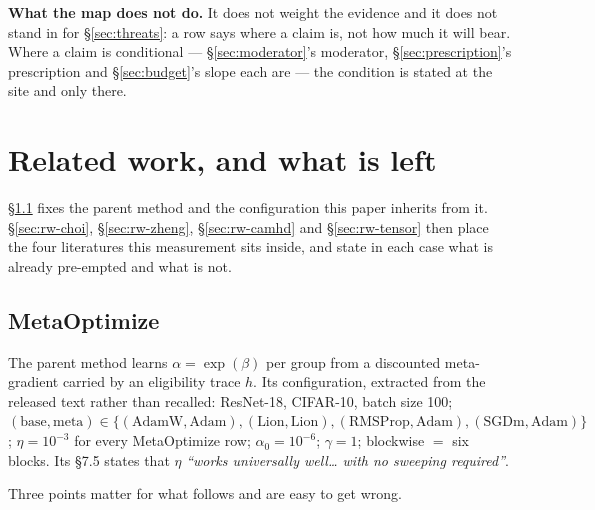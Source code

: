 \documentclass[10pt,letterpaper]{article}
\begin{document}
\textbf{What the map does not do.} It does not weight the evidence and it does not stand in for
\S\ref{sec:threats}: a row says where a claim is, not how much it will bear. Where a claim is
conditional --- \S\ref{sec:moderator}'s moderator, \S\ref{sec:prescription}'s prescription and
\S\ref{sec:budget}'s slope each are --- the condition is stated at the site and only there.

\section{Related work, and what is left}
\label{sec:related}

\S\ref{sec:rw-metaoptimize} fixes the parent method and the configuration this paper inherits from
it. \S\ref{sec:rw-choi}, \S\ref{sec:rw-zheng}, \S\ref{sec:rw-camhd} and \S\ref{sec:rw-tensor} then
place the four literatures this measurement sits inside, and state in each case what is already
pre-empted and what is not.

\subsection{MetaOptimize \citep{sharifnassab2025metaoptimize}}
\label{sec:rw-metaoptimize}

The parent method learns $\alpha = \exp(\beta)$ per group from a discounted meta-gradient
carried by an eligibility trace $h$. Its configuration, extracted from the released text rather
than recalled: ResNet-18, CIFAR-10, batch size 100;
$(\text{base}, \text{meta}) \in \{(\text{AdamW}, \text{Adam}), (\text{Lion}, \text{Lion}),
(\text{RMSProp}, \text{Adam}), (\text{SGDm}, \text{Adam})\}$; $\eta = 10^{-3}$ for every
MetaOptimize row; $\alpha_0 = 10^{-6}$; $\gamma = 1$; blockwise $=$ six blocks. Its \S7.5
states that $\eta$ \emph{``works universally well\ldots{} with no sweeping required''}.

Three points matter for what follows and are easy to get wrong.
\end{document}
